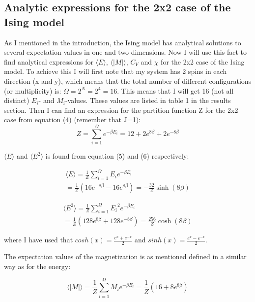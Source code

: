 \documentclass[twocolumn]{article}
\begin{document}
\subsection{Analytic expressions for the 2x2 case of the Ising model}
As I mentioned in the introduction, the Ising model has analytical solutions to several expectation values in one and two dimensions. Now I will use this fact to find analytical expressions for $\langle E \rangle$, $\langle |M| \rangle$, $C_V$ and $\chi$ for the 2x2 case of the Ising model. To achieve this I will first note that my system has 2 spins in each direction (x and y), which means that the total number of different configurations (or multiplicity) is: $\Omega = 2^N = 2^4 = 16$. This means that I will get 16 (not all distinct) $E_i$- and $M_i$-values. These values are listed in table 1 in the results section.\newline
Then I can find an expression for the partition function Z for the 2x2 case from equation (4) (remember that J=1):
\begin{equation}
    Z = \sum_{i=1}^{\Omega}e^{-\beta E_i} = 12 + 2e^{8\beta} + 2e^{-8\beta}
\end{equation}

$\langle E \rangle$ and $\langle E^2 \rangle$ is found from equation (5) and (6) respectively:

\begin{equation}
\begin{multlined}
    \langle E \rangle = \frac{1}{Z}\sum_{i=1}^{\Omega}E_i e^{-\beta E_i}\\ = \frac{1}{Z}(16e^{-8\beta} - 16e^{8\beta}) = -\frac{32}{Z}\sinh(8\beta)
\end{multlined}
\end{equation}

\begin{equation}
\begin{multlined}
    \langle E^2 \rangle = \frac{1}{Z}\sum_{i=1}^{\Omega}{E_i}^2 e^{-\beta E_i}\\ = \frac{1}{Z}( 128e^{8\beta} + 128e^{-8\beta} ) = \frac{256}{Z}\cosh(8\beta)
\end{multlined}
\end{equation}

where I have used that $cosh(x)=\frac{e^x + e^{-x}}{2}$ and $sinh(x)=\frac{e^x - e^{-x}}{2}$.

The expectation values of the magnetization is as mentioned defined in a similar way as for the energy:

\begin{equation}
    \langle |M| \rangle = \frac{1}{Z}\sum_{i=1}^{\Omega}M_i e^{-\beta E_i} = \frac{1}{Z}( 16 + 8e^{8\beta} )
\end{equation}
\end{document}
